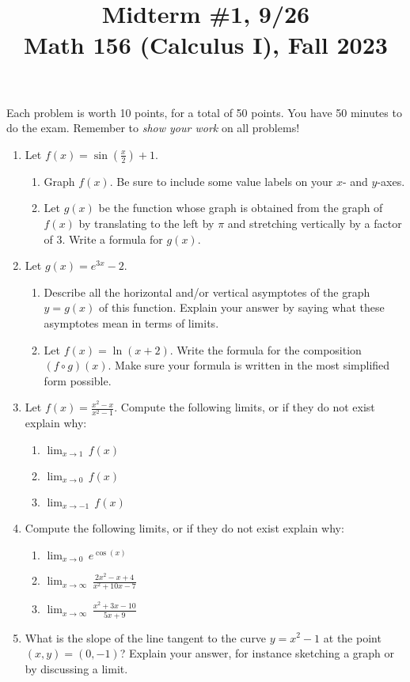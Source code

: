 \documentclass[11pt]{article}
\title{Midterm \#1, 9/26 \\ Math 156 (Calculus I), Fall 2023}
\date{}
\begin{document}
\maketitle

\thispagestyle{empty}

\vspace{-1cm}

Each problem is worth 10 points, for a total of 50 points. You have 50 minutes to do the exam. Remember to \emph{show your work} on all problems!

\begin{enumerate}
\item Let $f(x) = \sin(\frac{x}{2})+1$.
\begin{enumerate}
\item Graph $f(x)$. Be sure to include some value labels on your $x$- and $y$-axes.
\item Let $g(x)$ be the function whose graph is obtained from the graph of $f(x)$ by translating to the left by $\pi$ and stretching vertically by a factor of $3$. Write a formula for $g(x)$.
\end{enumerate}
\item Let $g(x)=e^{3x} - 2$. 
\begin{enumerate}
\item Describe all the horizontal and/or vertical asymptotes of the graph $y=g(x)$ of this function. Explain your answer by saying what these asymptotes mean in terms of limits.
\item Let $f(x) = \ln(x+2)$. Write the formula for the composition $(f\circ g)(x)$. Make sure your formula is written in the most simplified form possible.
\end{enumerate} 
\item Let $f(x) = \displaystyle \frac{x^2-x}{x^2-1}$. Compute the following limits, or if they do not exist explain why:
\begin{enumerate}
\item $\displaystyle \lim_{x \to 1} \, f(x)$
\item $\displaystyle \lim_{x \to 0} \, f(x)$
\item $\displaystyle \lim_{x \to -1} \, f(x)$
\end{enumerate}
\item Compute the following limits, or if they do not exist explain why:
\begin{enumerate}
\item $\displaystyle \lim_{x \to 0} \, e^{\cos(x)}$
\item $\displaystyle \lim_{x \to \infty} \, \frac{2x^2-x+4}{x^2+10x-7}$
\item $\displaystyle \lim_{x \to \infty} \, \frac{x^2+3x-10}{5x+9}$
\end{enumerate}
\item What is the slope of the line tangent to the curve $y=x^2-1$ at the point $(x,y)=(0,-1)$? Explain your answer, for instance sketching a graph or by discussing a limit.
\end{enumerate}
\end{document}
